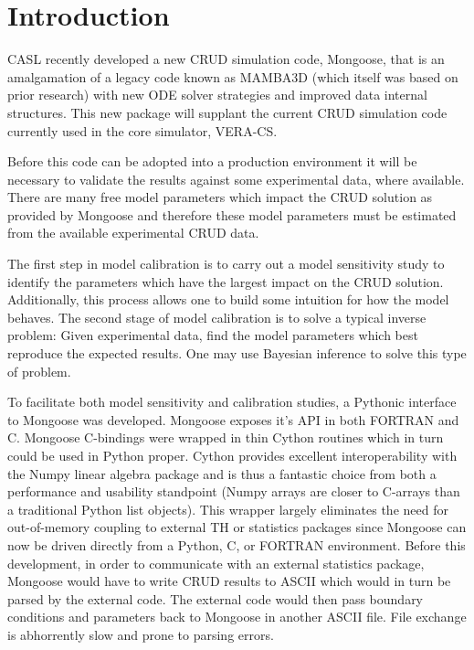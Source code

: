 \documentclass[10pt,a4paper]{report}
\begin{document}
\pagebreak
\onehalfspacing

\chapter{Introduction}

CASL recently developed a new CRUD simulation code, Mongoose,  that is an amalgamation of a legacy code known as MAMBA3D (which itself was based on prior research) with new ODE solver strategies and improved data internal structures.  This new package will supplant the current CRUD simulation code currently used in the core simulator, VERA-CS.

Before this code can be adopted into a production environment it will be necessary to validate the results against some experimental data, where available.  There are many free model parameters which impact the CRUD solution as provided by Mongoose and therefore these model parameters must be estimated from the available experimental CRUD data.

The first step in model calibration is to carry out a model sensitivity study to identify the parameters which have the largest impact on the CRUD solution.  Additionally, this process allows one to build some intuition for how the model behaves.  The second stage of model calibration is to solve a typical inverse problem:  Given experimental data, find the model parameters which best reproduce the expected results.  One may use Bayesian inference to solve this type of problem.

To facilitate both model sensitivity and calibration studies, a Pythonic interface to Mongoose was developed. Mongoose exposes it's API in both FORTRAN and C.  Mongoose C-bindings were wrapped in thin Cython routines which in turn could be used in Python proper.  Cython provides excellent interoperability with the Numpy linear algebra package and is thus a fantastic choice from both a performance and usability standpoint (Numpy arrays are closer to C-arrays than a traditional Python list objects).  This wrapper largely eliminates the need for out-of-memory coupling to external TH or statistics packages since Mongoose can now be driven directly from a Python, C, or FORTRAN environment.  Before this development, in order to communicate with an external statistics package, Mongoose would have to write CRUD results to ASCII which would in turn be parsed by the external code.  The external code would then pass boundary conditions and parameters back to Mongoose in another ASCII file.  File exchange is abhorrently slow and prone to parsing errors.
\end{document}
